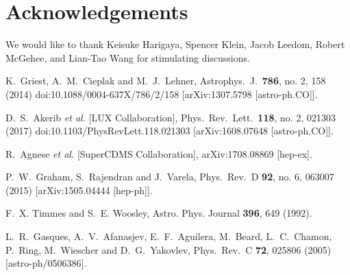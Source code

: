 \documentclass[preprintnumbers,amsmath,amssymb,prd, superscriptaddress,twocolumn]{revtex4}
\begin{document}
\section*{Acknowledgements}
We would like to thank Keisuke Harigaya, Spencer Klein, Jacob Leedom, Robert McGehee, and Lian-Tao Wang for stimulating discussions.

\begin{thebibliography}{99}


  K.~Griest, A.~M.~Cieplak and M.~J.~Lehner,
  Astrophys.\ J.\  {\bf 786}, no. 2, 158 (2014)
  doi:10.1088/0004-637X/786/2/158
  [arXiv:1307.5798 [astro-ph.CO]].

  D.~S.~Akerib {\it et al.} [LUX Collaboration],
  Phys.\ Rev.\ Lett.\  {\bf 118}, no. 2, 021303 (2017)
  doi:10.1103/PhysRevLett.118.021303
  [arXiv:1608.07648 [astro-ph.CO]].

  R.~Agnese {\it et al.} [SuperCDMS Collaboration],
  arXiv:1708.08869 [hep-ex].

  P.~W.~Graham, S.~Rajendran and J.~Varela,
  Phys.\ Rev.\ D {\bf 92}, no. 6, 063007 (2015)
  [arXiv:1505.04444 [hep-ph]].


 F.~X. Timmes and S.~E. Woosley, Astro. Phys. Journal {\bf 396}, 649 (1992).

  L.~R.~Gasques, A.~V.~Afanasjev, E.~F.~Aguilera, M.~Beard, L.~C.~Chamon, P.~Ring, M.~Wiescher and D.~G.~Yakovlev,
  Phys.\ Rev.\ C {\bf 72}, 025806 (2005)
  [astro-ph/0506386].



\end{thebibliography}
\end{document}
